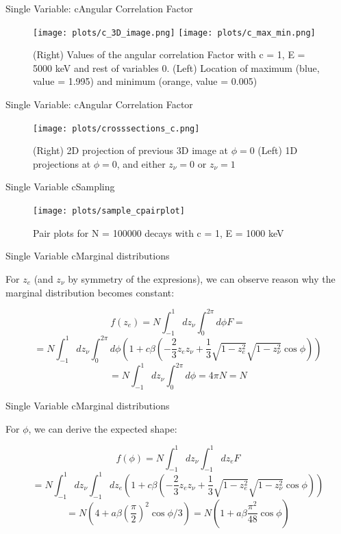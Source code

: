 \documentclass{beamer}
\begin{document}
\begin{frame}{Single Variable: c}{Angular Correlation Factor}
	\begin{figure}
		\centering
		\texttt{[image: plots/c\_3D\_image.png]}
		\texttt{[image: plots/c\_max\_min.png]}
		\caption{(Right) Values of the angular correlation Factor with c = 1, E = 5000 keV and rest of variables 0. (Left) Location of maximum (blue, value = 1.995) and minimum (orange, value = 0.005)}	
	\end{figure}
\end{frame}
\begin{frame}{Single Variable: c}{Angular Correlation Factor}
	\begin{figure}
		\centering
		\texttt{[image: plots/crosssections\_c.png]}
		\caption{(Right) 2D projection of previous 3D image at $\phi = 0$ (Left) 1D projections at $\phi=0$, and either $z_\nu = 0$ or $z_\nu = 1$}
	\end{figure}
\end{frame}
\begin{frame}{Single Variable c}{Sampling}
	\begin{figure}
		\centering
		\texttt{[image: plots/sample\_cpairplot]}
		\caption{Pair plots for N = 100000 decays with c = 1, E = 1000 keV}
	\end{figure}
\end{frame}
\begin{frame}{Single Variable c}{Marginal distributions}

	
	For $z_e$ (and $z_\nu$ by symmetry of the expresions), we can observe reason why the marginal distribution becomes constant: 
	
	$$f(z_e) = N\int_{-1}^{1}dz_\nu\int_{0}^{2\pi}d\phi F =$$$$= N\int_{-1}^{1}dz_\nu\int_{0}^{2\pi}d\phi \left(1 + c\beta\left(-\frac 23 z_ez_\nu+\frac 13 \sqrt{1-z^2_e}\sqrt{1-z^2_\nu}\cos \phi\right)\right) $$$$ = N\int_{-1}^{1}dz_\nu\int_{0}^{2\pi}d\phi = 4\pi N = N $$

	
\end{frame}
\begin{frame}{Single Variable c}{Marginal distributions}
	
	
	For $\phi$, we can derive the expected shape: 
	
	$$f(\phi) = N\int_{-1}^{1}dz_\nu\int_{-1}^{1}dz_e F $$$$= N\int_{-1}^{1}dz_\nu\int_{-1}^{1}dz_e \left(1 + c\beta\left(-\frac 23 z_ez_\nu+\frac 13 \sqrt{1-z^2_e}\sqrt{1-z^2_\nu}\cos \phi\right)\right)$$$$ = N\left(4+a\beta\left(\frac{\pi}{2}\right)^2\cos\phi/3\right) = N\left(1+a\beta\frac{\pi^2}{48}\cos\phi\right)  $$
	
	
\end{frame}
\end{document}
